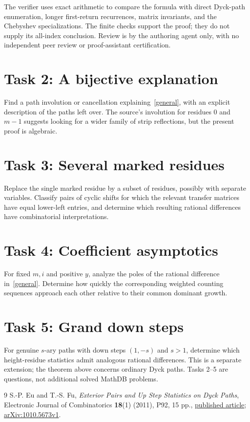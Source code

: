 \documentclass[11pt]{article}
\begin{document}
The verifier uses exact arithmetic to compare the formula with direct
Dyck-path enumeration, longer first-return recurrences, matrix invariants,
and the Chebyshev specializations. The finite checks support the proof;
they do not supply its all-index conclusion. Review is by the authoring
agent only, with no independent peer review or proof-assistant certification.

\section*{Task 2: A bijective explanation}
Find a path involution or cancellation explaining~\eqref{general}, with
an explicit description of the paths left over. The source's involution
for residues $0$ and $m-1$ suggests looking for a wider family of strip
reflections, but the present proof is algebraic.

\section*{Task 3: Several marked residues}
Replace the single marked residue by a subset of residues, possibly with
separate variables. Classify pairs of cyclic shifts for which the relevant
transfer matrices have equal lower-left entries, and determine which
resulting rational differences have combinatorial interpretations.

\section*{Task 4: Coefficient asymptotics}
For fixed $m,i$ and positive $y$, analyze the poles of the rational
difference in~\eqref{general}. Determine how quickly the corresponding
weighted counting sequences approach each other relative to their common
dominant growth.

\section*{Task 5: Grand down steps}
For genuine $s$-ary paths with down steps $(1,-s)$ and $s>1$, determine
which height-residue statistics admit analogous rational differences.
This is a separate extension; the theorem above concerns ordinary Dyck paths.
Tasks 2--5 are questions, not additional solved MathDB problems.

\begin{thebibliography}{9}
 S.-P. Eu and T.-S. Fu,
\emph{Exterior Pairs and Up Step Statistics on Dyck Paths},
Electronic Journal of Combinatorics \textbf{18}(1) (2011), P92, 15 pp.,
\href{https://www.combinatorics.org/ojs/index.php/eljc/article/download/v18i1p92/pdf/}{published article};
\href{https://arxiv.org/abs/1010.5673}{arXiv:1010.5673v1}.
\end{thebibliography}
\end{document}
